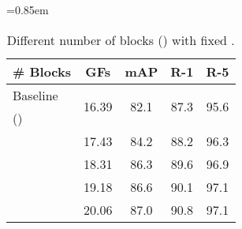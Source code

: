 \documentclass[10pt,twocolumn,letterpaper]{article}
\begin{document}
\begin{table*}[t]
\begin{subtable}[t]{0.32\textwidth}
		\footnotesize
		\caption{ Different number of blocks () with fixed .}
		\label{tab:numofblocks}
		{\def\arraystretch{1.08}\tabcolsep=0.85em
		\begin{tabular}[t]{@{}l|cccc@{}}
			\toprule[1.5pt]
			\# Blocks   & \multicolumn{1}{c|}{GFs} & mAP & R-1 & R-5  \\
			\midrule
			Baseline                &  \multicolumn{1}{c|}{\multirow{2}{*}{16.39}}    & \multirow{2}{*}{82.1}    & \multirow{2}{*}{87.3}    & \multirow{2}{*}{95.6}     \\
			() & \multicolumn{1}{c|}{}  &  &  &  \\
			\midrule
			                  & \multicolumn{1}{c|}{17.43}     & 84.2    & 88.2    & 96.3    \\
			                  & \multicolumn{1}{c|}{18.31}     & 86.3    & 89.6    & 96.9   \\
			                  & \multicolumn{1}{c|}{19.18}     & 86.6    & 90.1    & 97.1    \\
			                  & \multicolumn{1}{c|}{20.06}     & 87.0    & 90.8    & 97.1    \\
			\bottomrule[1.5pt]
		\end{tabular}
		}
	\end{subtable}
	\hfill
	

\end{table*}
\end{document}

